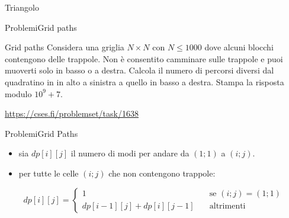 \documentclass{beamer}
\begin{document}
\begin{frame}{Triangolo}{}
\end{frame}

\begin{frame}[fragile]{Problemi}{Grid paths}
    \begin{exampleblock}{Grid paths}
        Considera una griglia $N \times N$ con $N \leq 1000$ dove alcuni blocchi contengono delle trappole. Non \`e consentito camminare sulle trappole e puoi muoverti solo in basso o a destra. Calcola il numero di percorsi diversi dal quadratino in in alto a sinistra a quello in basso a destra. Stampa la risposta modulo $10^9 + 7$.
    \end{exampleblock}
    \small{\underline{\url{https://cses.fi/problemset/task/1638}}}
\end{frame}

\begin{frame}{Problemi}{Grid Paths}
    \begin{itemize}
        \item sia $dp[i][j]$ il numero di modi per andare da $(1;1)$ a $(i;j)$.
        \item per tutte le celle $(i;j)$ che non contengono trappole:
    \end{itemize}
    \pause
    \[
        dp[i][j] =
        \begin{cases}
            1 \quad &\text{se $(i;j) = (1;1)$} \\
            dp[i-1][j] + dp[i][j-1] \quad &\text{altrimenti}
        \end{cases}
    \]
\end{frame}
\end{document}
